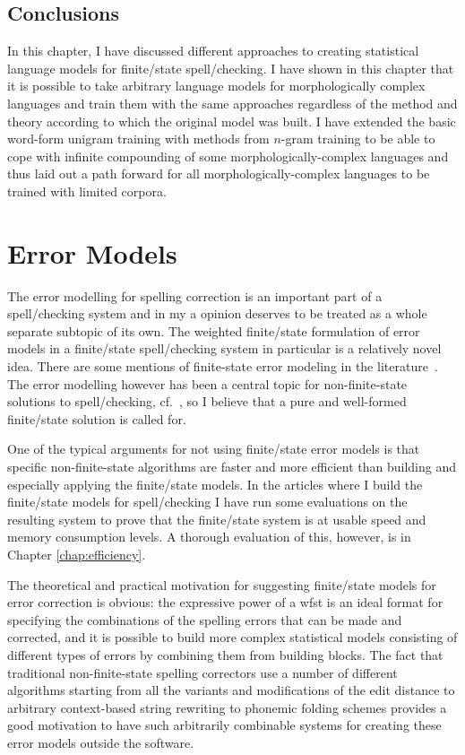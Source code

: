 \documentclass[officiallayout]{unihelcompling}
\begin{document}
\section{Conclusions}

In this chapter, I have discussed different approaches to creating
statistical language models for finite\-/state spell\-/checking. I have
shown in this chapter that it is possible to take arbitrary language models for
morphologically complex languages and train them with the same approaches
regardless of the method and theory according to which the original model was
built. I have extended the basic word-form unigram training with methods from
\(n\)-gram training to be able to cope with infinite compounding of some
morphologically-complex languages and thus laid out a path forward for all
morphologically-complex languages to be trained with limited corpora.


\chapter{Error Models}
\label{chap:error-models}

The error modelling for spelling correction is an important part of a
spell\-/checking system and in my a opinion deserves to be treated as a whole
separate subtopic of its own. The weighted finite\-/state formulation of
\glspl{error model} in a finite\-/state spell\-/checking system in particular
is a relatively novel idea. There are some mentions of finite-state error
modeling in the
literature~\citep{agirre1992xuxen,vannoord2001extendible,agata2002typographical,mohri2003edit}.  The
error modelling however has been a central topic for non-finite-state solutions
to spell\-/checking,
cf.~\citet{kukich1992spelling,mitton2009ordering,deorowicz2005correcting}, so I
believe that a pure and well-formed finite\-/state solution is called for.

One of the typical arguments for not using finite\-/state error models is that
specific non-finite-state algorithms are faster and more efficient than
building and especially applying the finite\-/state models. In the articles
where I build the finite\-/state models for spell\-/checking I have run some
evaluations on the resulting system to prove that the finite\-/state system is
at usable speed and memory consumption levels. A thorough evaluation of this,
however, is in Chapter \ref{chap:efficiency}.

The theoretical and practical motivation for suggesting finite\-/state models
for error correction is obvious: the expressive power of a \gls{wfst} is an
ideal format for specifying the combinations of the spelling errors that can be
made and corrected, and it is possible to build more complex statistical models
consisting of different types of errors by combining them from building blocks.
The fact that traditional non-finite-state spelling correctors use a number of
different algorithms starting from all the variants and modifications of the
edit distance to arbitrary context-based string rewriting to phonemic folding
schemes provides a good motivation to have such arbitrarily combinable systems
for creating these error models outside the software.
\end{document}
